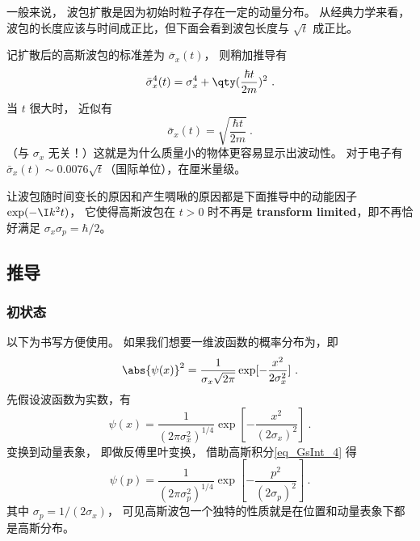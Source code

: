 一般来说， 波包扩散是因为初始时粒子存在一定的动量分布。 从经典力学来看，波包的长度应该与时间成正比，但下面会看到波包长度与 $\sqrt{t}$ 成正比。

记扩散后的高斯波包的标准差为 $\bar\sigma_x(t)$， 则稍加推导有
\begin{equation}
\bar\sigma^4_x(t) = \sigma_x^4 + \qty(\frac{\hbar t}{2m})^2~.
\end{equation}
当 $t$ 很大时， 近似有
\begin{equation}
\bar\sigma_x(t) = \sqrt{\frac{\hbar t}{2m}}~.
\end{equation}
（与 $\sigma_x$ 无关！）这就是为什么质量小的物体更容易显示出波动性。 对于电子有 $\bar\sigma_x(t) \sim 0.0076\sqrt{t}$（国际单位），在厘米量级。

让波包随时间变长的原因和产生啁啾的原因都是下面推导中的动能因子 $\exp(-\I k^2 t)$， 它使得高斯波包在 $t > 0$ 时不再是 \textbf{transform limited}，即不再恰好满足 $\sigma_x \sigma_p = \hbar/2$。

\subsection{推导}
\subsubsection{初状态}

以下为书写方便使用。 如果我们想要一维波函数的概率分布为，即
\begin{equation}
\abs{\psi (x)}^2 = \frac{1}{\sigma_x \sqrt{2\pi}} \exp[-\frac{x^2}{2\sigma_x^2}]~.
\end{equation}
先假设波函数为实数，有
\begin{equation}
\psi (x) = \frac{1}{(2\pi\sigma_x^2)^{1/4}} \exp[-\frac{x^2}{(2\sigma_x)^2}]~.
\end{equation}
变换到动量表象， 即做反傅里叶变换， 借助高斯积分\autoref{eq_GsInt_4}  得
\begin{equation}
\psi(p) = \frac{1}{(2\pi\sigma_p^2)^{1/4}} \exp[-\frac{p^2}{(2\sigma_p)^2}]~.
\end{equation}
其中 $\sigma_p = 1/(2\sigma_x)$， 可见高斯波包一个独特的性质就是在位置和动量表象下都是高斯分布。

